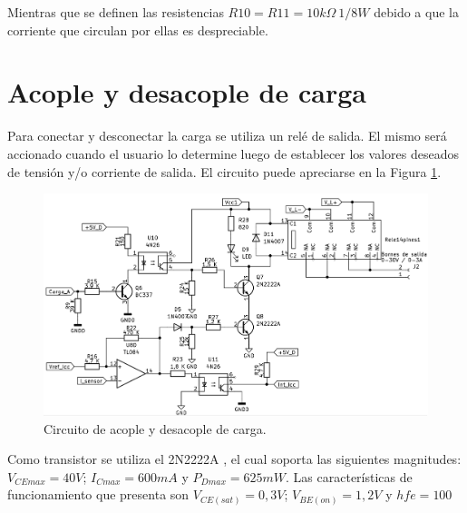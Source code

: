 Mientras que se definen las resistencias $R10=R11=10 k\Omega \ 1/8W$ debido a que la corriente que circulan por ellas es despreciable.\par 



\section{Acople y desacople de carga}
Para conectar y desconectar la carga se utiliza un relé de salida. El mismo será accionado cuando el usuario lo determine luego de establecer los valores deseados de tensión y/o corriente de salida. El circuito puede apreciarse en la Figura \ref{F:Circuito_Acople_carga}.

\begin{figure} [H]
	\centering
	\includegraphics[width=\textwidth]{./imagenes/Acople_carga.png}
	\caption{Circuito de acople y desacople de carga.}
	\label{F:Circuito_Acople_carga}
\end{figure} \par 

Como transistor se utiliza el 2N2222A \cite{2N2222}, el cual soporta las siguientes magnitudes: $V_{CEmax}=40V$; $I_{Cmax}=600 mA$ y $P_{Dmax}=625 mW$. Las características de funcionamiento que presenta son $V_{CE(sat)}=0,3V$; $V_{BE(on)}=1,2V$ y $hfe=100$

